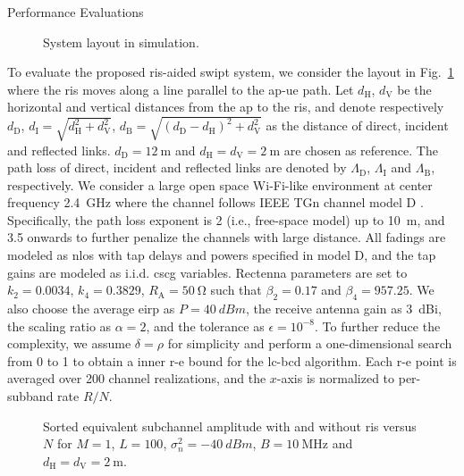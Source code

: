 \begin{section}{Performance Evaluations}\label{se:performance_evaluation}
	\begin{figure}[!t]
		\centering
		\def\svgwidth{0.9\columnwidth}
		
		\caption{System layout in simulation.}
		\label{fi:layout}
	\end{figure}

	To evaluate the proposed \gls{ris}-aided \gls{swipt} system, we consider the layout in Fig.~\ref{fi:layout} where the \gls{ris} moves along a line parallel to the \gls{ap}-\gls{ue} path. Let $d_{\mathrm{H}}$, $d_{\mathrm{V}}$ be the horizontal and vertical distances from the \gls{ap} to the \gls{ris}, and denote respectively $d_{\mathrm{D}}$, $d_{\mathrm{I}}=\sqrt{d_{\mathrm{H}}^2+d_{\mathrm{V}}^2}$, $d_{\mathrm{B}}=\sqrt{(d_{\mathrm{D}}-d_{\mathrm{H}})^2+d_{\mathrm{V}}^2}$ as the distance of direct, incident and reflected links. $d_{\mathrm{D}}=\qty{12}{\meter}$ and $d_{\mathrm{H}}=d_{\mathrm{V}}=\qty{2}{\meter}$ are chosen as reference. The path loss of direct, incident and reflected links are denoted by $\Lambda_{\mathrm{D}}$, $\Lambda_{\mathrm{I}}$ and $\Lambda_{\mathrm{B}}$, respectively. We consider a large open space Wi-Fi-like environment at center frequency \qty{2.4}{\GHz} where the channel follows IEEE TGn channel model D \cite{Erceg2004}. Specifically, the path loss exponent is \num{2} (i.e., free-space model) up to \qty{10}{\meter}, and \num{3.5} onwards to further penalize the channels with large distance. All fadings are modeled as \gls{nlos} with tap delays and powers specified in model D, and the tap gains are modeled as i.i.d. \gls{cscg} variables. Rectenna parameters are set to $k_2=0.0034$, $k_4=0.3829$, $R_{\mathrm{A}}=\qty{50}{\ohm}$ \cite{Clerckx2016a} such that $\beta_2=0.17$ and $\beta_4=957.25$. We also choose the average \gls{eirp} as $P=\qty{40}{dBm}$, the receive antenna gain as \qty{3}{dBi}, the scaling ratio as $\alpha=2$, and the tolerance as $\epsilon=10^{-8}$. To further reduce the complexity, we assume $\delta=\rho$ for simplicity and perform a one-dimensional search from \num{0} to \num{1} to obtain a inner \gls{r-e} bound for the \gls{lc}-\gls{bcd} algorithm. Each \gls{r-e} point is averaged over \num{200} channel realizations, and the $x$-axis is normalized to per-subband rate $R/N$.

	\begin{figure}[!t]
		\centering
		\resizebox{0.8\columnwidth}{!}{
			
		}
		\caption{Sorted equivalent subchannel amplitude with and without \gls{ris} versus $N$ for $M=1$, $L=100$, $\sigma_n^2=\qty{-40}{dBm}$, $B=\qty{10}{\MHz}$ and $d_{\mathrm{H}}=d_{\mathrm{V}}=\qty{2}{\meter}$.}
		\label{fi:channel_amplitude}
	\end{figure}


\end{section}
